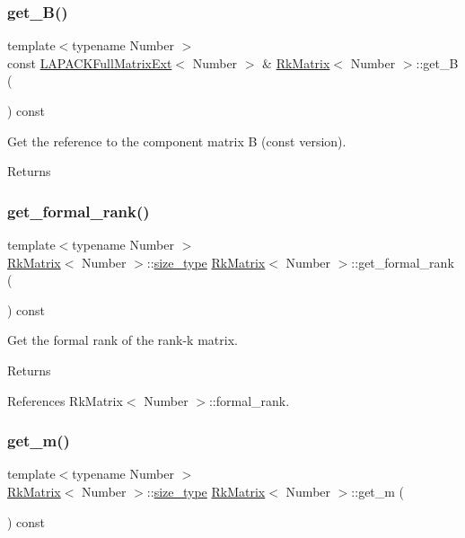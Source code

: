 \subsubsection{\texorpdfstring{get\+\_\+\+B()}{get\_B()}\hspace{0.1cm}{\footnotesize\ttfamily [2/2]}}
{\footnotesize\ttfamily template$<$typename Number $>$ \\
const \hyperlink{classLAPACKFullMatrixExt}{L\+A\+P\+A\+C\+K\+Full\+Matrix\+Ext}$<$ Number $>$ \& \hyperlink{classRkMatrix}{Rk\+Matrix}$<$ Number $>$\+::get\+\_\+B (\begin{DoxyParamCaption}{ }\end{DoxyParamCaption}) const}

Get the reference to the component matrix {\ttfamily B} (const version). \begin{DoxyReturn}{Returns}

\end{DoxyReturn}
\mbox{\label{classRkMatrix_ae69122e3ee1c49a4fbe48cf3d7a20581}} 
\subsubsection{\texorpdfstring{get\+\_\+formal\+\_\+rank()}{get\_formal\_rank()}}
{\footnotesize\ttfamily template$<$typename Number $>$ \\
\hyperlink{classRkMatrix}{Rk\+Matrix}$<$ Number $>$\+::\hyperlink{classRkMatrix_add060bfc3a4cc77f858c3d6dd58cadd5}{size\+\_\+type} \hyperlink{classRkMatrix}{Rk\+Matrix}$<$ Number $>$\+::get\+\_\+formal\+\_\+rank (\begin{DoxyParamCaption}{ }\end{DoxyParamCaption}) const}

Get the formal rank of the rank-\/k matrix. \begin{DoxyReturn}{Returns}

\end{DoxyReturn}


References Rk\+Matrix$<$ Number $>$\+::formal\+\_\+rank.

\mbox{\label{classRkMatrix_a58686c65ca8c952558eae4fa185e7d6a}} 
\subsubsection{\texorpdfstring{get\+\_\+m()}{get\_m()}}
{\footnotesize\ttfamily template$<$typename Number $>$ \\
\hyperlink{classRkMatrix}{Rk\+Matrix}$<$ Number $>$\+::\hyperlink{classRkMatrix_add060bfc3a4cc77f858c3d6dd58cadd5}{size\+\_\+type} \hyperlink{classRkMatrix}{Rk\+Matrix}$<$ Number $>$\+::get\+\_\+m (\begin{DoxyParamCaption}{ }\end{DoxyParamCaption}) const}

